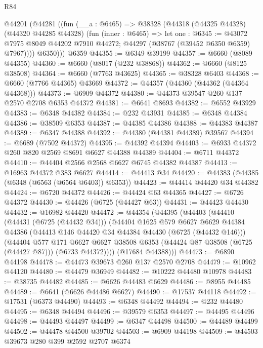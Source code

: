 \begin{lexlean}{R84}
\begin{coremodule}
    @44201
      (@44281
        ((fun (__a : @6465) =>
        @38328
          (@44318
            (@44325 @44328)
            (@44320 @44285 @44328)
            (fun (inner : @6465) =>
            let one : @6345 := @43072 @7975 @8049 @44202 @7910 @44272;
            @44297 (@38767 (@39452 @6350 @6359) @7967))))
          @6350)))
    @6359
@44355 := @6349 @39199
@44357 := @6660 (@8089 @44355)
@44360 := @6660 (@8017 (@232 @38868))
@44362 := @6660 (@8125 @38508)
@44364 := @6660 (@7763 @43625)
@44365 := @38328 @6403
@44368 := @6660 (@7766 @44365) @43669
@44372 := @44357 (@44360 (@44362 (@44364 @44368)))
@44373 := @6909 @44372
@44380 := @44373 @39547 @260 @137 @2570 @2708 @6353 @44372
@44381 := @6641 @8693
@44382 := @6552 @43929
@44383 := @6348 @44382
@44384 := @232 @43931
@44385 := @6348 @44384
@44386 := @38509 @6353
@44387 := @44385 @44386
@44388 := @44383 @44387
@44389 := @6347 @44388
@44392 := @44380 (@44381 @44389) @39567
@44394 := @6689 (@7502 @44372)
@44395 := @44392 @44394
@44403 := @6933 @44372 @260 @820 @2569 @8691 @6627 @44388 @44389
@44404 := @6711 @44372
@44410 := @44404 @2566 @2568 @6627 @6745 @44382 @44387
@44413 := @16963 @44372 @383 @6627
@44414 := @44413 @34
@44420 := @44383 (@44385 (@6348 (@6563 (@6564 @6403)) @6353))
@44423 := @44414 @44420 @34 @44382
@44424 := @6720 @44372
@44426 := @44424 @63 @44365
@44427 := @6726 @44372
@44430 := @44426 (@6725 (@44427 @63))
@44431 := @44423 @44430
@44432 := @16982 @44420
@44472 := @44354
    (@44395
      (@44403
        (@44410
          (@44431 (@6725 (@44432 @34)))
          (@44404
            @1625
            @579
            @6627
            @6629
            @44384
            @44386
            (@44413 @146 @44420 @34 @44384 @44430 (@6725 (@44432 @146)))
            (@44404
              @577
              @171
              @6627
              @6627
              @38508
              @6353
              (@44424 @87 @38508 (@6725 (@44427 @87)))
              (@6733 @44372))))
        (@17684 @44388)))
@44473 := @6890 @44198
@44478 := @44473 @39673 @260 @137 @2570 @2708
@44479 := @10962 @44120
@44480 := @44479 @36949
@44482 := @10222 @44480 @10978
@44483 := @38735 @44482
@44485 := @6626 @44483 @6629
@44486 := @8955 @44485
@44489 := @6641 (@6626 @44486 @6627)
@44490 := @17537 @44118
@44492 := @17531 (@6373 @44490)
@44493 := @6348 @44492
@44494 := @232 @44480
@44495 := @6348 @44494
@44496 := @39579 @6353
@44497 := @44495 @44496
@44498 := @44493 @44497
@44499 := @6347 @44498
@44500 := @44489 @44499
@44502 := @44478 @44500 @39702
@44503 := @6909 @44198
@44509 := @44503 @39673 @280 @399 @2592 @2707 @6374

\end{coremodule}
\end{lexlean}
